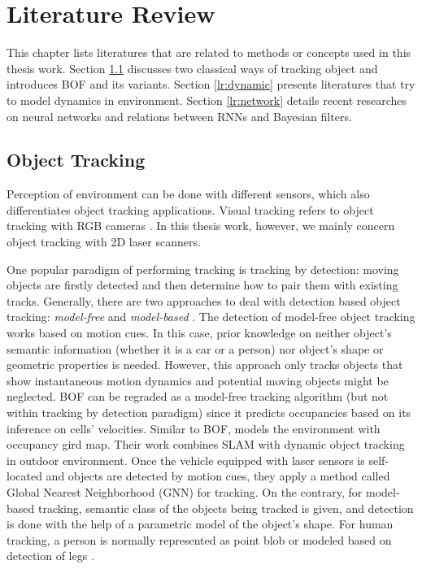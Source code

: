 \chapter{Literature Review} \label{chapter:2}

This chapter lists literatures that are related to methods or concepts used in this thesis work. Section \ref{lr:tracking} discusses two classical ways of tracking object and introduces BOF and its variants. Section \ref{lr:dynamic} presents literatures that try to model dynamics in environment. Section \ref{lr:network} details recent researches on neural networks and relations between RNNs and Bayesian filters. 

\section{Object Tracking} \label{lr:tracking}

Perception of environment can be done with different sensors, which also differentiates object tracking applications. Visual tracking refers to object tracking with RGB cameras \citep{ross2008incremental}. In this thesis work, however, we mainly concern object tracking with 2D laser scanners. 

One popular paradigm of performing tracking is tracking by detection: moving objects are firstly detected and then determine how to pair them with existing tracks. Generally, there are two approaches to deal with detection based object tracking: \textit{model-free} and \textit{model-based} \citep{wang2015model}. The detection of model-free object tracking works based on motion cues. In this case, prior knowledge on neither object's semantic information (whether it is a car or a person) nor object's shape or geometric properties is needed. However, this approach only tracks objects that show instantaneous motion dynamics and potential moving objects might be neglected. BOF can be regraded as a model-free tracking algorithm (but not within tracking by detection paradigm) since it predicts occupancies based on its inference on cells' velocities. Similar to BOF, \citet{ross2008incremental} models the environment with occupancy gird map. Their work combines SLAM with dynamic object tracking in outdoor environment. Once the vehicle equipped with laser sensors is self-located and objects are detected by motion cues, they apply a method called Global Nearest Neighborhood (GNN) for tracking. On the contrary, for model-based tracking, semantic class of the objects being tracked is given, and detection is done with the help of a parametric model of the object's shape. For human tracking, a person is normally represented as point blob or modeled based on detection of legs \citep{arras2008efficient, cui2006laser}. 

